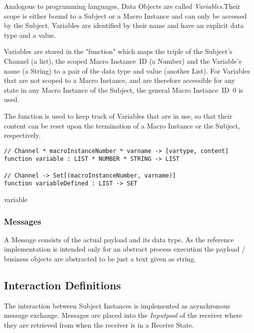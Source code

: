 
Analogous to programming languages, Data Objects are called \textit{Variables}.Their scope is either bound to a Subject or a Macro Instance and can only be accessed by the Subject. Variables are identified by their name and have an explicit data type and a value.

Variables are stored in the  "function" which maps the triple of the Subject's Channel (a list), the scoped Macro Instance~ID (a Number) and the Variable's name (a String) to a pair of the data type and value (another List). For Variables that are not scoped to a Macro Instance, and are therefore accessible for any state in any Macro Instance of the Subject, the general Macro Instance~ID~$0$ is used.

The function  is used to keep track of Variables that are in use, so that their content can be reset upon the termination of a Macro Instance or the Subject, respectively.

\begin{listing}[htbp]
\begin{verbatim}
// Channel * macroInstanceNumber * varname -> [vartype, content]
function variable : LIST * NUMBER * STRING -> LIST

// Channel -> Set[(macroInstanceNumber, varname)]
function variableDefined : LIST -> SET
\end{verbatim}
\caption{variable}
\label{lst:shortasm:variable}
\end{listing}


\subsubsection{Messages}\label{sec:messages}

A Message consists of the actual payload and its data type. As the reference implementation is intended only for an abstract process execution the payload / business objects are abstracted to be just a text given as string.

\subsection{Interaction Definitions}
\label{sec:InteractionDefinitions}

The interaction between Subject Instances is implemented as asynchronous message exchange. Messages are placed into the \textit{Inputpool} of the receiver where they are retrieved from when the receiver is in a Receive State.

